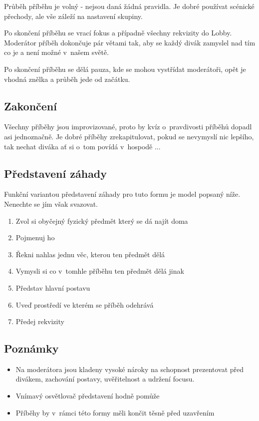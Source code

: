 Průběh příběhu je volný - nejsou daná žádná pravidla. Je dobré používat scénické přechody, ale vše záleží na nastavení skupiny. 
 
Po skončení příběhu se vrací fokus a případně všechny rekvizity do Lobby. Moderátor příběh dokončuje pár větami tak, aby se každý divák zamyslel nad tím co je a není možné v~našem světě.  
 
Po skončení příběhu se dělá pauza, kde se mohou vystřídat moderátoři, opět je vhodná znělka a průběh jede od začátku. 
 
\subsection{ Zakončení }  
Všechny příběhy jsou improvizované, proto by kvíz o~pravdivosti příběhů dopadl asi jednoznačně. Je dobré příběhy zrekapitulovat, pokud se nevymyslí nic lepšího, tak nechat diváka ať si o~tom povídá v~hospodě ... 
 
\subsection{ Představení záhady }  
Funkční variantou představení záhady pro tuto formu je model popsaný níže. Nenechte se jím však svazovat. 
 
\begin{enumerate}
\item  Zvol si obyčejný fyzický předmět který se dá najít doma
\item  Pojmenuj ho
\item  Řekni nahlas jednu věc, kterou ten předmět dělá
\item  Vymysli si co v~tomhle příběhu ten předmět dělá jinak
\item  Představ hlavní postavu
\item  Uveď prostředí ve kterém se příběh odehrává
\item  Předej rekvizity
\end{enumerate}
 
\subsection{ Poznámky } \begin{itemize}
\item  Na moderátora jsou kladeny vysoké nároky na schopnost prezentovat před divákem, zachování postavy, uvěřitelnost a udržení focusu.
\item  Vnímavý osvětlovač představení hodně pomůže
\item  Příběhy by v~rámci této formy měli končit těsně před uzavřením
\end{itemize}
 
 
